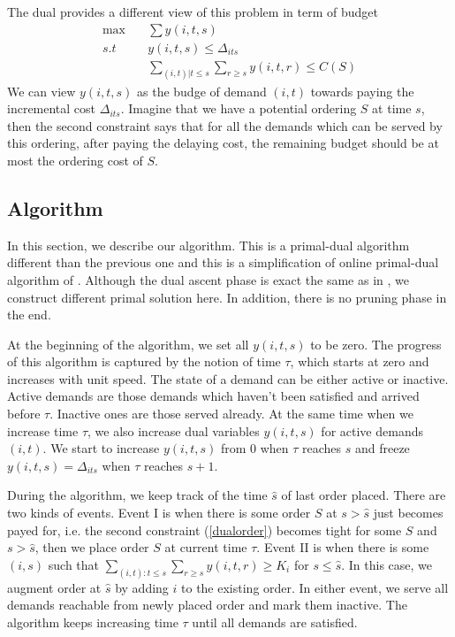 The dual provides a different view of this problem in term of budget
\begin{align}
	\max \quad & \sum y(i,t,s) \\
	s.t \quad & y(i,t,s) \le \Delta_{its} \\
	& \sum_{(i,t) | t \le s} \sum_{r\ge s} y(i,t,r) \le C(S) \label{dualorder}
\end{align}
We can view $y(i,t,s)$ as the budge of demand $(i,t)$ towards paying the incremental cost $\Delta_{its}$. Imagine that we have a potential ordering $S$ at time $s$, then the second constraint says that for all the demands which can be served by this ordering, after paying the delaying cost, the remaining budget should be at most the ordering cost of $S$.

\subsection{Algorithm}
In this section, we describe our algorithm. This is a primal-dual algorithm different than the previous one \cite{levi2006primal} and this is a simplification of online primal-dual algorithm of \cite{buchbinder2008online}. Although the dual ascent phase is exact the same as in \cite{levi2006primal}, we construct different primal solution here. In addition, there is no pruning phase in the end.

At the beginning of the algorithm, we set all $y(i,t,s)$ to be zero. The progress of this algorithm is captured by the notion of time $\tau$, which starts at zero and increases with unit speed. The state of a demand can be either active or inactive. Active demands are those demands which haven't been satisfied and arrived before $\tau$. Inactive ones are those served already. At the same time when we increase time $\tau$, we also increase dual variables $y(i,t,s)$ for active demands $(i,t)$. We start to increase $y(i,t,s)$ from 0 when $\tau$ reaches $s$ and freeze $y(i,t,s)=\Delta_{its}$ when $\tau$ reaches $s+1$.

During the algorithm, we keep track of the time $\hat s$ of last order placed. There are two kinds of events. Event I is when there is some order $S$ at $s > \hat s$ just becomes payed for, i.e. the second constraint (\ref{dualorder}) becomes tight for some $S$ and $s > \hat s$, then we place order $S$ at current time $\tau$. Event II is when there is some $(i,s)$ such that $\sum_{(i,t): t\le s} \sum_{r\ge s} y(i,t,r) \ge K_i$ for $s \le \hat s$. In this case, we augment order at $\hat s$ by adding $i$ to the existing order. In either event, we serve all demands reachable from newly placed order and mark them inactive. The algorithm keeps increasing time $\tau$ until all demands are satisfied.

